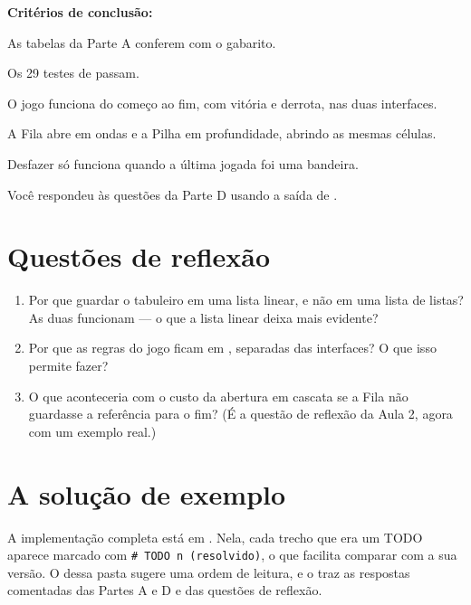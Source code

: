 \documentclass[11pt]{article}
\begin{document}
\textbf{Critérios de conclusão:}
\begin{conferencia}
  \item As tabelas da Parte A conferem com o gabarito.
  \item Os 29 testes de  passam.
  \item O jogo funciona do começo ao fim, com vitória e derrota, nas duas interfaces.
  \item A Fila abre em ondas e a Pilha em profundidade, abrindo as mesmas células.
  \item Desfazer só funciona quando a última jogada foi uma bandeira.
  \item Você respondeu às questões da Parte D usando a saída de .
\end{conferencia}

\section{Questões de reflexão}

\begin{enumerate}
  \item Por que guardar o tabuleiro em uma lista linear, e não em uma lista de listas? As duas
        funcionam — o que a lista linear deixa mais evidente?
  \item Por que as regras do jogo ficam em , separadas das interfaces? O que
        isso permite fazer?
  \item O que aconteceria com o custo da abertura em cascata se a Fila não guardasse a referência
        para o fim? (É a questão de reflexão da Aula 2, agora com um exemplo real.)
\end{enumerate}

\section{A solução de exemplo}

A implementação completa está em . Nela, cada trecho que era um
TODO aparece marcado com \lstinline[style=inline]|# TODO n (resolvido)|, o que facilita comparar com a sua versão.
O  dessa pasta sugere uma ordem de leitura, e o  traz as
respostas comentadas das Partes A e D e das questões de reflexão.
\end{document}
